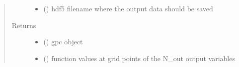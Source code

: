\documentclass[letterpaper,10pt,english,openany,oneside]{sphinxmanual}
\begin{document}
\begin{fulllineitems}
\begin{quote}
\begin{description}
\begin{itemize}
\item {} 
 (\sphinxstyleliteralemphasis{\sphinxupquote{, }}\sphinxstyleliteralemphasis{\sphinxupquote{, }}) \textendash{} hdf5 filename where the output data should be saved

\end{itemize}

\item[{Returns}] \leavevmode
\begin{itemize}
\item {} 
 () \textendash{} gpc object

\item {} 
 () \textendash{} function values at grid points of the N\_out output variables

\end{itemize}


\end{description}\end{quote}

\end{fulllineitems}

\end{document}
